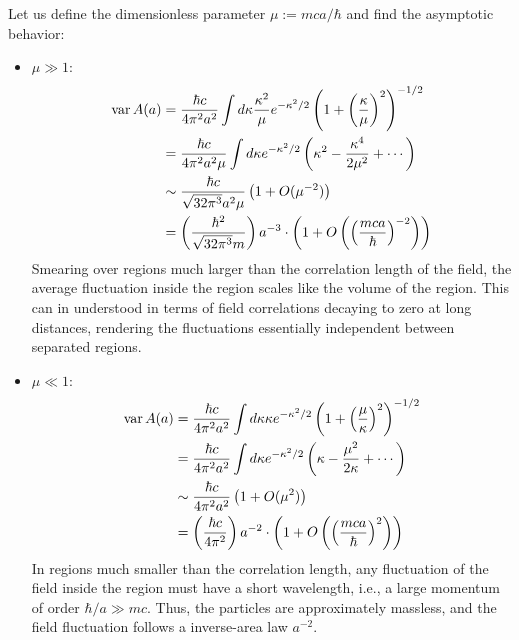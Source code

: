 \documentclass[11pt]{article}
\begin{document}
Let us define the dimensionless parameter $\mu := mca/\hbar$ and find the asymptotic behavior:
\begin{itemize}
    \item $\mu \gg 1$:
        \begin{align*}
            \operatorname{var} A(a)
            &= \frac{\hbar c}{4\pi^2 a^2} \int d\kappa
                \frac{\kappa^2}{\mu} e^{-\kappa^2/2} \left(
                    1 + \left(\frac{\kappa}{\mu}\right)^2
                \right)^{-1/2} \\
            &= \frac{\hbar c}{4\pi^2 a^2 \mu} \int d\kappa
                e^{-\kappa^2/2}\left(\kappa^2 - \frac{\kappa^4}{2\mu^2} + \cdots\right) \\
            &\sim \frac{\hbar c}{\sqrt{32\pi^3}a^2 \mu} \left(1 + O(\mu^{-2})\right) \\
            &= \left(\frac{\hbar^2}{\sqrt{32\pi^3} m}\right) a^{-3} \cdot \left(
                1 + O\left(\left(\frac{mca}{\hbar}\right)^{-2}\right)
            \right)
        \end{align*}
        Smearing over regions much larger than the correlation length of the field,
        the average fluctuation inside the region scales like the volume of the region.
        This can in understood in terms of field correlations decaying to zero at long distances,
        rendering the fluctuations essentially independent between separated regions.

    \item $\mu \ll 1$:
        \begin{align*}
            \operatorname{var} A(a)
            &= \frac{\hbar c}{4\pi^2 a^2} \int d\kappa
                \kappa e^{-\kappa^2/2} \left(
                    1 + \left(\frac{\mu}{\kappa}\right)^2
                \right)^{-1/2} \\
            &= \frac{\hbar c}{4\pi^2 a^2} \int d\kappa
                e^{-\kappa^2/2}\left(\kappa - \frac{\mu^2}{2\kappa} + \cdots\right) \\
            &\sim \frac{\hbar c}{4\pi^2 a^2} \left(1 + O(\mu^2)\right) \\
            &= \left(\frac{\hbar c}{4\pi^2}\right) a^{-2} \cdot \left(
                1 + O\left(\left(\frac{mca}{\hbar}\right)^2\right)
            \right)
        \end{align*}
        In regions much smaller than the correlation length,
        any fluctuation of the field inside the region must have a short wavelength,
        i.e., a large momentum of order $\hbar / a \gg mc$.
        Thus, the particles are approximately massless,
        and the field fluctuation follows a inverse-area law $a^{-2}$.
\end{itemize}
\end{document}
